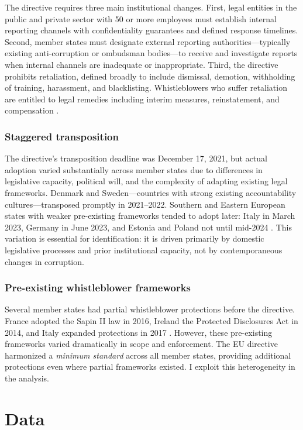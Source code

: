 \documentclass[12pt]{article}
\begin{document}
The directive requires three main institutional changes. First, legal entities in the public and private sector with 50 or more employees must establish internal reporting channels with confidentiality guarantees and defined response timelines. Second, member states must designate external reporting authorities---typically existing anti-corruption or ombudsman bodies---to receive and investigate reports when internal channels are inadequate or inappropriate. Third, the directive prohibits retaliation, defined broadly to include dismissal, demotion, withholding of training, harassment, and blacklisting. Whistleblowers who suffer retaliation are entitled to legal remedies including interim measures, reinstatement, and compensation \citep{eu_directive_2019}.

\subsubsection*{Staggered transposition} The directive's transposition deadline was December 17, 2021, but actual adoption varied substantially across member states due to differences in legislative capacity, political will, and the complexity of adapting existing legal frameworks. Denmark and Sweden---countries with strong existing accountability cultures---transposed promptly in 2021--2022. Southern and Eastern European states with weaker pre-existing frameworks tended to adopt later: Italy in March 2023, Germany in June 2023, and Estonia and Poland not until mid-2024 \citep{transparency_intl_2023}. This variation is essential for identification: it is driven primarily by domestic legislative processes and prior institutional capacity, not by contemporaneous changes in corruption.

\subsubsection*{Pre-existing whistleblower frameworks} Several member states had partial whistleblower protections before the directive. France adopted the Sapin II law in 2016, Ireland the Protected Disclosures Act in 2014, and Italy expanded protections in 2017 \citep{wolfe_2014}. However, these pre-existing frameworks varied dramatically in scope and enforcement. The EU directive harmonized a \textit{minimum standard} across all member states, providing additional protections even where partial frameworks existed. I exploit this heterogeneity in the analysis.

\section{Data}
\end{document}
